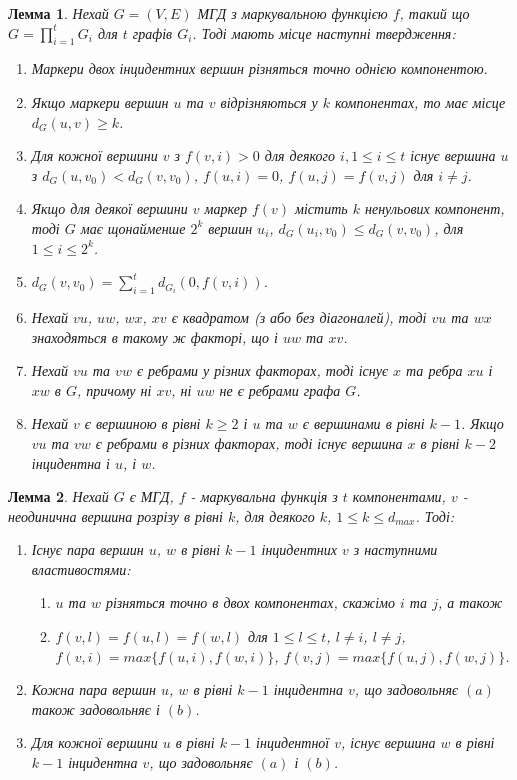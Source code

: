 \newtheorem{lemma}{Лемма}

\begin{lemma}
  Нехай $G=(V,E)$ МГД з маркувальною функцією $f$, такий що $\displaystyle G=\prod_{i=1}^t G_i$ для $t$ графів $G_i$.
Тоді мають місце наступні твердження:
\begin{enumerate}
\item Маркери двох інцидентних вершин різняться точно однією компонентою.
\item Якщо маркери вершин $u$ та $v$ відрізняються у $k$ компонентах, то має місце $d_G(u,v) \ge k$.
\item Для кожної вершини $v$ з $f(v,i) > 0$ для деякого $i,1 \le i \le t$ існує вершина $u$ з $d_G(u,v_0) < d_G(v,v_0)$, $f(u,i)=0$, $f(u,j)=f(v,j)$ для $i \ne j$.
\item Якщо для деякої вершини $v$ маркер $f(v)$ містить $k$ ненульових компонент, тоді $G$ має щонайменше $2^k$ вершин $u_i$, $d_G(u_i,v_0) \le d_G(v,v_0)$, для $1 \le i \le 2^k$.
\item $d_G(v,v_0)=\sum_{i=1}^t d_{G_i}(0,f(v,i))$.
\item Нехай $vu$, $uw$, $wx$, $xv$ є квадратом (з або без діагоналей), тоді $vu$ та $wx$ знаходяться в такому ж факторі, що і $uw$ та $xv$.
\item Нехай $vu$ та $vw$ є ребрами у різних факторах, тоді існує $x$ та ребра $xu$ і $xw$ в $G$, причому ні $xv$, ні $uw$ не є ребрами графа $G$.
\item Нехай $v$ є вершиною в рівні $k \ge 2$ і $u$ та $w$ є вершинами в рівні $k-1$. Якщо $vu$ та $vw$ є ребрами в різних факторах, тоді існує вершина $x$ в рівні $k-2$ інцидентна і $u$, і $w$.
\end{enumerate}
\end{lemma}

\begin{lemma}
  Нехай $G$ є МГД, $f$ - маркувальна функція з $t$ компонентами, $v$ - неодинична вершина розрізу в рівні $k$, для деякого $k$, $1 \le k \le d_{max}$. Тоді:
  \begin{enumerate}
    \item Існує пара вершин $u$, $w$ в рівні $k-1$ інцидентних $v$ з наступними властивостями:
      \begin{enumerate}
        \item $u$ та $w$ різняться точно в двох компонентах, скажімо $i$ та $j$, а також
        \item $f(v,l)=f(u,l)=f(w,l)$ для $1 \le l \le t$, $l \ne i$, $l \ne j$, $f(v,i)=max \lbrace f(u,i),f(w,i) \rbrace$, $f(v,j)=max \lbrace f(u,j),f(w,j) \rbrace$.
      \end{enumerate}
    \item Кожна пара вершин $u$, $w$ в рівні $k-1$ інцидентна $v$, що задовольняє $(a)$ також задовольняє і $(b)$.
    \item Для кожної вершини $u$ в рівні $k-1$ інцидентної $v$, існує вершина $w$ в рівні $k-1$ інцидентна $v$, що задовольняє $(a)$ і $(b)$.
  \end{enumerate}
\end{lemma}

